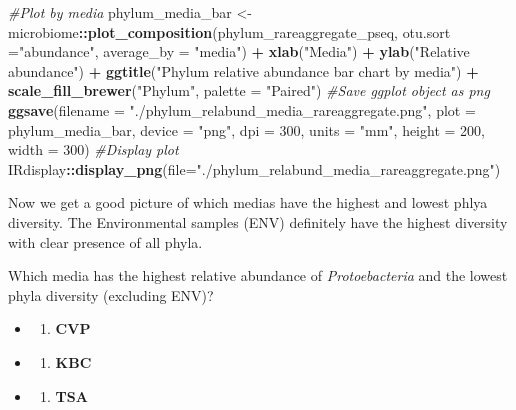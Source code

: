 \documentclass[
]{book}
\newenvironment{Shaded}{\begin{snugshade}}{\end{snugshade}}
\newcommand{\AttributeTok}[1]{\textcolor[rgb]{0.13,0.29,0.53}{#1}}
\newcommand{\CommentTok}[1]{\textcolor[rgb]{0.56,0.35,0.01}{\textit{#1}}}
\newcommand{\DecValTok}[1]{\textcolor[rgb]{0.00,0.00,0.81}{#1}}
\newcommand{\FunctionTok}[1]{\textcolor[rgb]{0.13,0.29,0.53}{\textbf{#1}}}
\newcommand{\NormalTok}[1]{#1}
\newcommand{\OtherTok}[1]{\textcolor[rgb]{0.56,0.35,0.01}{#1}}
\newcommand{\SpecialCharTok}[1]{\textcolor[rgb]{0.81,0.36,0.00}{\textbf{#1}}}
\newcommand{\StringTok}[1]{\textcolor[rgb]{0.31,0.60,0.02}{#1}}
\providecommand{\tightlist}{%
  \setlength{\itemsep}{0pt}\setlength{\parskip}{0pt}}
\begin{document}
\begin{Shaded}
\begin{Highlighting}[]
\CommentTok{\#Plot by media}
\NormalTok{phylum\_media\_bar }\OtherTok{\textless{}{-}} 
\NormalTok{  microbiome}\SpecialCharTok{::}\FunctionTok{plot\_composition}\NormalTok{(phylum\_rareaggregate\_pseq, }
                               \AttributeTok{otu.sort =}\StringTok{"abundance"}\NormalTok{,}
                               \AttributeTok{average\_by =} \StringTok{"media"}\NormalTok{) }\SpecialCharTok{+}
  \FunctionTok{xlab}\NormalTok{(}\StringTok{"Media"}\NormalTok{) }\SpecialCharTok{+} \FunctionTok{ylab}\NormalTok{(}\StringTok{"Relative abundance"}\NormalTok{) }\SpecialCharTok{+}
  \FunctionTok{ggtitle}\NormalTok{(}\StringTok{"Phylum relative abundance bar chart by media"}\NormalTok{) }\SpecialCharTok{+}
  \FunctionTok{scale\_fill\_brewer}\NormalTok{(}\StringTok{"Phylum"}\NormalTok{, }\AttributeTok{palette =} \StringTok{"Paired"}\NormalTok{)}
\CommentTok{\#Save ggplot object as png}
\FunctionTok{ggsave}\NormalTok{(}\AttributeTok{filename =} \StringTok{"./phylum\_relabund\_media\_rareaggregate.png"}\NormalTok{, }\AttributeTok{plot =}\NormalTok{ phylum\_media\_bar,}
       \AttributeTok{device =} \StringTok{"png"}\NormalTok{, }\AttributeTok{dpi =} \DecValTok{300}\NormalTok{, }\AttributeTok{units =} \StringTok{"mm"}\NormalTok{, }\AttributeTok{height =} \DecValTok{200}\NormalTok{, }\AttributeTok{width =} \DecValTok{300}\NormalTok{)}
\CommentTok{\#Display plot}
\NormalTok{IRdisplay}\SpecialCharTok{::}\FunctionTok{display\_png}\NormalTok{(}\AttributeTok{file=}\StringTok{"./phylum\_relabund\_media\_rareaggregate.png"}\NormalTok{)}
\end{Highlighting}
\end{Shaded}

Now we get a good picture of which medias have the highest and lowest phlya diversity.
The Environmental samples (ENV) definitely have the highest diversity with clear presence of all phyla.

Which media has the highest relative abundance of \emph{Protoebacteria} and the lowest phyla diversity (excluding ENV)?

\begin{itemize}
\item
  \begin{enumerate}
  \def\labelenumi{(\Alph{enumi})}
  \tightlist
  \item
    \textbf{CVP}\\
  \end{enumerate}
\item
  \begin{enumerate}
  \def\labelenumi{(\Alph{enumi})}
  \setcounter{enumi}{1}
  \tightlist
  \item
    \textbf{KBC}\\
  \end{enumerate}
\item
  \begin{enumerate}
  \def\labelenumi{(\Alph{enumi})}
  \setcounter{enumi}{2}
  \tightlist
  \item
    \textbf{TSA}
  \end{enumerate}
\end{itemize}
\end{document}
